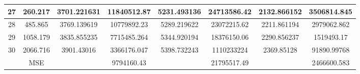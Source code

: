 \documentclass{article}
\begin{document}
\begin{flushleft}
\begin{adjustbox}{width=1.1\textwidth,center=\textwidth}
\begin{tabular}{|c|c|c|c|c|c|c|c|}
        \hline
        27&260.217	&3701.221631	&11840512.87	&5231.493136	&24713586.42	&2132.866152	&3506814.845\\
        \hline
        28&	485.865&	3769.139619&	10779892.23&	5289.219622&	23072215.62&	2211.861194&	2979062.862\\
        \hline
        29	&1058.179	&3835.855235	&7715485.264	&5344.920194	&18376150.06	&2290.856237	&1519493.17\\
        \hline
        30	&2066.716&	3901.43016&	3366176.047&	5398.732243&	1110233224&	2369.85128&	91890.99768\\
        \hline
        {}&	{MSE}&{}&		9794160.43
&{}&		21795517.49
&{}&	2466600.583
\\
        \hline
        \end{tabular}
        \end{adjustbox}
    \end{flushleft}
    
\end{document}
